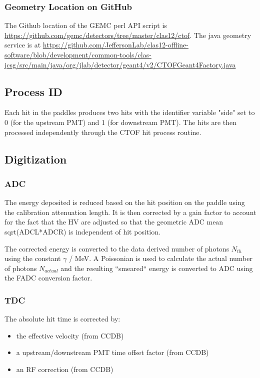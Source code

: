 \subsubsection{Geometry Location on GitHub}
The Github location of the GEMC perl API script is \url{https://github.com/gemc/detectors/tree/master/clas12/ctof}.
The java geometry service is at \url{https://github.com/JeffersonLab/clas12-offline-software/blob/development/common-tools/clas-jcsg/src/main/java/org/jlab/detector/geant4/v2/CTOFGeant4Factory.java}

\subsection{Process ID}

Each hit in the paddles produces two hits with the identifier variable "side" set to 0 (for the upstream PMT) and 1 (for downstream PMT).
The hits are then processed independently through the CTOF hit process routine.

\subsection{Digitization}

\subsubsection{ADC}

The energy deposited is reduced based on the hit position on the paddle using the calibration attenuation length. It is then corrected by a gain factor
to account for the fact that the HV are adjusted so that the geometric ADC mean sqrt(ADCL*ADCR) is independent of hit position.

The corrected energy is converted to the data derived number of photons $N_{th}$ using the constant $\gamma$ / MeV. A Poissonian is used to
calculate the actual number of photons $N_{actual}$ and the resulting ``smeared`` energy is converted to ADC using the FADC conversion factor.


\subsubsection{TDC}

The absolute hit time is corrected by:

\begin{itemize}
	\item the effective velocity (from CCDB)
	\item a upstream/downstream PMT time offset factor (from CCDB)
	\item an RF correction (from CCDB)
\end{itemize}

